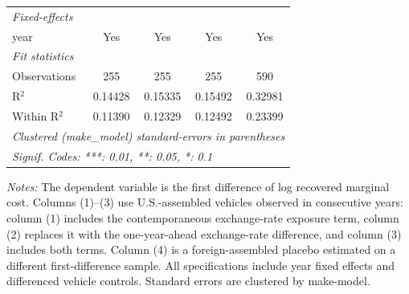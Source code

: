 \begin{table}[htbp]
\begin{tabular}{lcccc}
      \emph{Fixed-effects}\\
      year                                            & Yes           & Yes            & Yes           & Yes\\
      \midrule
      \emph{Fit statistics}\\
      Observations                                    & 255           & 255            & 255           & 590\\
      R$^2$                                           & 0.14428       & 0.15335        & 0.15492       & 0.32981\\
      Within R$^2$                                    & 0.11390       & 0.12329        & 0.12492       & 0.23399\\
      \midrule \midrule
      \multicolumn{5}{l}{\emph{Clustered (make\_model) standard-errors in parentheses}}\\
      \multicolumn{5}{l}{\emph{Signif. Codes: ***: 0.01, **: 0.05, *: 0.1}}\\
   \end{tabular}
\vspace{0.25em}
\begin{minipage}{0.96\textwidth}
\footnotesize \textit{Notes:} The dependent variable is the first difference of log recovered marginal cost. Columns (1)--(3) use U.S.-assembled vehicles observed in consecutive years: column (1) includes the contemporaneous exchange-rate exposure term, column (2) replaces it with the one-year-ahead exchange-rate difference, and column (3) includes both terms. Column (4) is a foreign-assembled placebo estimated on a different first-difference sample. All specifications include year fixed effects and differenced vehicle controls. Standard errors are clustered by make-model.
\end{minipage}
\end{table}
